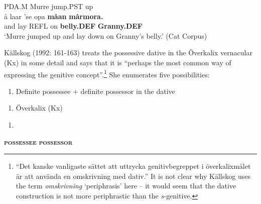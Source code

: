 PDA.M  Murre  jump.PST  up\\ %


\ea\label{}
\gll å  laar  ’se  opa  \textbf{måan}\textbf{  mårmora.}\\


and  lay  REFL  on  \textbf{belly.DEF} \textbf{Granny.DEF}\\ %


‘Murre jumped up and lay down on Granny’s belly.’ (Cat Corpus)
\z


Källskog (1992: 161-163) treats the possessive dative in the Överkalix vernacular (Kx) in some detail and says that it is “perhaps the most common way of expressing the genitive concept”.\footnote{ “Det kanske vanligaste sättet att uttrycka genitivbegreppet i överkalixmålet är att använda en omskrivning med dativ.” It is not clear why Källskog uses the term \textit{omskrivning} ‘periphrasis’ here – it would seem that the dative construction is not more periphrastic than the \textit{s-}genitive.} She enumerates five possibilities:

\begin{enumerate} %
\item 
Definite possessee + definite possessor in the dative

\end{enumerate} %
\begin{enumerate} %
\item 
Överkalix (Kx)

\end{enumerate} %
\setcounter{listLFOxcviiileveli}{0}
\begin{enumerate} %
\item 
\end{enumerate} %
\ea\label{}
\gll \textbf{\textsc{possessee}}  \textbf{\textsc{possessor}}\\


